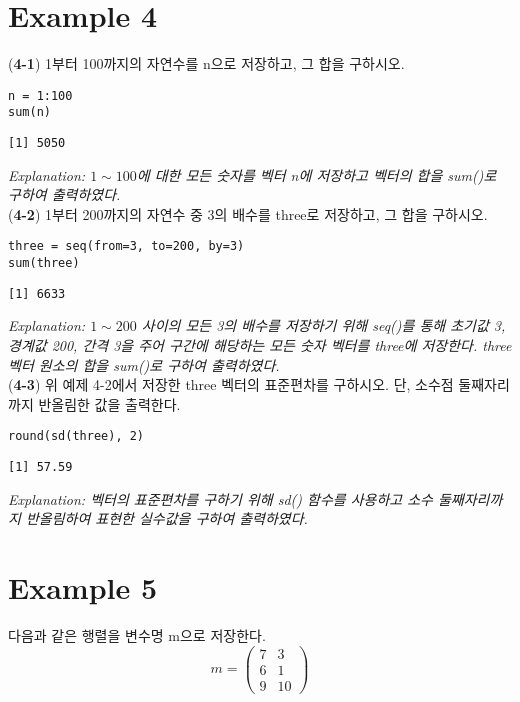 \documentclass{article}
\begin{document}
\section*{Example 4}

(\textbf{4-1}) 1부터 100까지의 자연수를 n으로 저장하고, 그 합을 구하시오.
\begin{lstlisting}[style={r-style}]
n = 1:100
sum(n)
\end{lstlisting}
\begin{lstlisting}[style={out-style}]
[1] 5050
\end{lstlisting}
\emph{Explanation: $1\sim100$에 대한 모든 숫자를 벡터 n에 저장하고 벡터의 합을 sum()로 구하여 출력하였다.} \\

(\textbf{4-2}) 1부터 200까지의 자연수 중 3의 배수를 three로 저장하고, 그 합을 구하시오.
\begin{lstlisting}[style={r-style}]
three = seq(from=3, to=200, by=3)
sum(three)
\end{lstlisting}
\begin{lstlisting}[style={out-style}]
[1] 6633
\end{lstlisting}
\emph{Explanation: $1\sim200$ 사이의 모든 3의 배수를 저장하기 위해 seq()를 통해 초기값 3, 경계값 200, 간격 3을 주어 구간에 해당하는 모든 숫자 벡터를 three에 저장한다. three 벡터 원소의 합을 sum()로 구하여 출력하였다.} \\

\newpage
(\textbf{4-3}) 위 예제 4-2에서 저장한 three 벡터의 표준편차를 구하시오. 
단, 소수점 둘째자리까지 반올림한 값을 출력한다.
\begin{lstlisting}[style={r-style}]
round(sd(three), 2)
\end{lstlisting}
\begin{lstlisting}[style={out-style}]
[1] 57.59
\end{lstlisting}
\emph{Explanation: 벡터의 표준편차를 구하기 위해 sd() 함수를 사용하고 소수 둘째자리까지 반올림하여 표현한 실수값을 구하여 출력하였다.} \\

\section*{Example 5}
다음과 같은 행렬을 변수명 m으로 저장한다.
\begin{equation*}
    m = \begin{pmatrix}
        7 & 3 \\
        6 & 1 \\
        9 & 10
        \end{pmatrix}
\end{equation*}
\end{document}
